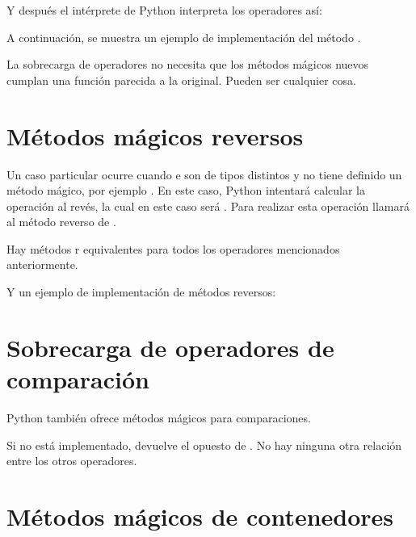 Y después el intérprete de Python interpreta los operadores así:


A continuación, se muestra un ejemplo de implementación del método .


La sobrecarga de operadores no necesita que los métodos mágicos nuevos cumplan una función parecida a la original.
Pueden ser cualquier cosa.

\section{Métodos mágicos reversos}

Un caso particular ocurre cuando  e  son de tipos distintos y  no tiene definido un método mágico, por ejemplo .
En este caso, Python intentará calcular la operación al revés, la cual en este caso será .
Para realizar esta operación llamará al método reverso  de .

Hay métodos r equivalentes para todos los operadores mencionados anteriormente.


Y un ejemplo de implementación de métodos reversos:


\section{Sobrecarga de operadores de comparación}

Python también ofrece métodos mágicos para comparaciones.


Si  no está implementado, devuelve el opuesto de .
No hay ninguna otra relación entre los otros operadores.


\section{Métodos mágicos de contenedores}

